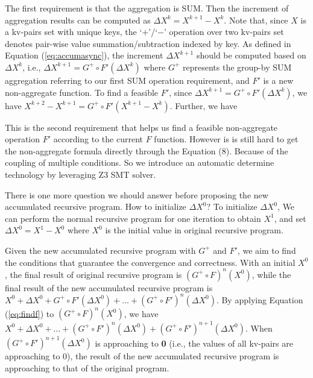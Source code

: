 {\color{green}
The first requirement is that the aggregation is SUM. Then the increment of aggregation results can be computed as $\Delta X^k=X^{k+1}-X^k$. Note that, since $X$ is a kv-pairs set with unique keys, the `$+$'/`$-$' operation over two kv-pairs set denotes pair-wise value summation/subtraction indexed by key. As defined in Equation (\ref{eq:accumasync}), the increment $\Delta X^{k+1}$ should be computed based on $\Delta X^k$, i.e., $\Delta X^{k+1}=G^{+}\circ F'(\Delta X^k)$ where $G^{+}$ represents the group-by SUM aggregation referring to our first SUM operation requirement, and $F'$ is a new non-aggregate function. To find a feasible $F'$, since $\Delta X^{k+1}=G^{+}\circ F'(\Delta X^k)$, we have $X^{k+2}-X^{k+1}=G^{+}\circ F'(X^{k+1}-X^k)$. Further, we have
}

This is the second requirement that helps us find a feasible non-aggregate operation $F'$ according to the current $F$ function. However is is still hard to get the non-aggregate formula directly through the Equation (8). Because of the coupling of multiple conditions. So we introduce an automatic determine technology by leveraging Z3 SMT solver.  
{\color{green} There is one more question we should answer before proposing the new accumulated recursive program. How to initialize $\Delta X^0$? To initialize $\Delta X^0$,  We can perform the normal recursive program for one iteration to obtain $X^1$, and set $\Delta X^0=X^1-X^0$ where $X^0$ is the initial value in original recursive program.

Given the new accumulated recursive program with $G^+$ and $F'$, we aim to find the conditions that guarantee the convergence and correctness. With an initial $X^0$, the final result of original recursive program is $(G^{+}\circ F)^n(X^0)$, while the final result of the new accumulated recursive program is $X^0+\Delta X^0+G^+\circ F'(\Delta X^0)+\ldots+(G^+\circ F')^n(\Delta X^0)$. By applying Equation (\ref{eq:findf}) to $(G^{+}\circ F)^n(X^0)$, we have $X^0+\Delta X^0+\ldots+(G^+\circ F')^n(\Delta X^0)+(G^+\circ F')^{n+1}(\Delta X^0)$. When $(G^+\circ F')^{n+1}(\Delta X^0)$ is approaching to \textbf{0} (i.e., the values of all kv-pairs are approaching to 0), the result of the new accumulated recursive program is approaching to that of the original program.
}

